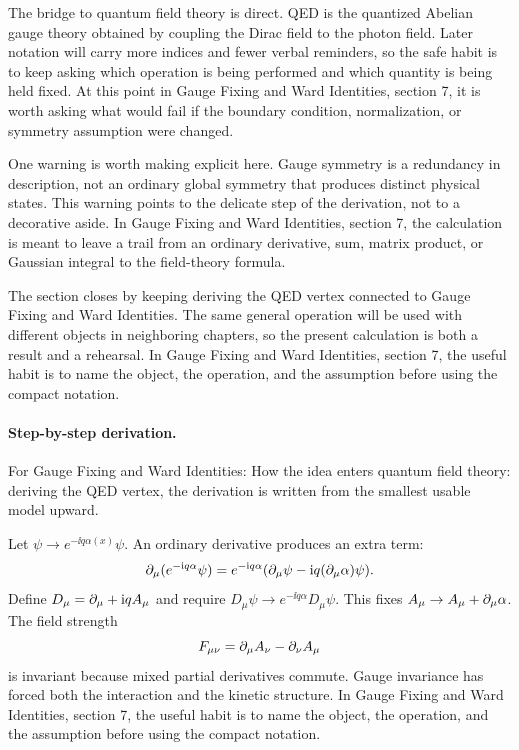 The bridge to quantum field theory is direct.  QED is the quantized Abelian gauge theory obtained by coupling the Dirac field to the photon field.  Later notation will carry more indices and fewer verbal reminders, so the safe habit is to keep asking which operation is being performed and which quantity is being held fixed.  At this point in Gauge Fixing and Ward Identities, section 7, it is worth asking what would fail if the boundary condition, normalization, or symmetry assumption were changed.

One warning is worth making explicit here.  Gauge symmetry is a redundancy in description, not an ordinary global symmetry that produces distinct physical states.  This warning points to the delicate step of the derivation, not to a decorative aside.  In Gauge Fixing and Ward Identities, section 7, the calculation is meant to leave a trail from an ordinary derivative, sum, matrix product, or Gaussian integral to the field-theory formula.

The section closes by keeping deriving the QED vertex connected to Gauge Fixing and Ward Identities.  The same general operation will be used with different objects in neighboring chapters, so the present calculation is both a result and a rehearsal.  In Gauge Fixing and Ward Identities, section 7, the useful habit is to name the object, the operation, and the assumption before using the compact notation.



\paragraph{Step-by-step derivation.}

For Gauge Fixing and Ward Identities: How the idea enters quantum field theory: deriving the QED vertex, the derivation is written from the smallest usable model upward.

Let \(\psi\to e^{-\ii q\alpha(x)}\psi\).  An ordinary derivative produces an extra term:
\[
  \partial_\mu(e^{-\mathrm i q\alpha}\psi)
  =
  e^{-\mathrm i q\alpha}(\partial_\mu\psi-\mathrm i q(\partial_\mu\alpha)\psi).
\]
Define \(D_\mu=\partial_\mu+\mathrm i qA_\mu\) and require \(D_\mu\psi\to e^{-\ii q\alpha}D_\mu\psi\).  This fixes \(A_\mu\to A_\mu+\partial_\mu\alpha\).  The field strength
\[
  F_{\mu\nu}=\partial_\mu A_\nu-\partial_\nu A_\mu
\]
is invariant because mixed partial derivatives commute.  Gauge invariance has forced both the interaction and the kinetic structure.  In Gauge Fixing and Ward Identities, section 7, the useful habit is to name the object, the operation, and the assumption before using the compact notation.

